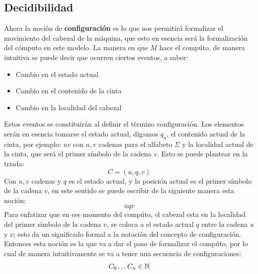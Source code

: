\documentclass[10pt]{report}
\begin{document}
     \subsection{Decidibilidad}\label{subsec:decidibilidad2}
    Ahora la noción de \textbf{configuración} es lo que nos permitirá formalizar el movimiento del
    cabezal de la máquina, que esto en esencia será la formalización del cómputo en este modelo.
    \newline
    La manera en que $M$ hace el compúto, de manera intuitiva se puede decir que ocurren ciertos eventos, a saber:
    \begin{itemize}
        \item Cambio en el estado actual
        \item Cambio en el contenido de la cinta
        \item Cambio en la localidad del cabezal
    \end{itemize}
    Estos eventos se constituirán al definir el término configuración.
    Los elementos serán en esencia tomarse el estado actual, digamos $q_{a}$, el contenido actual de la cinta, por ejemplo:
    $uv$ con $u,v$ cadenas para el alfabeto $\Sigma$ y la localidad actual de la cinta, que será el primer
    símbolo de la cadena $v$. \newline
    Esto se puede plantear en la triada:
    \begin{equation}
        C = (u,q,v)
    \end{equation}
    Con $u,v$ cadenas y $q$ es el estado actual, y la posición actual es el primer símbolo de la cadena $v$,
    en este sentido se puede escribir de la siguiente manera esta noción:
    \begin{equation}
        uqv
    \end{equation}
    Para enfatizar que en ese momento del compúto, el cabezal esta en la localidad del primer símbolo de la cadena
    $v$, se coloca a el estado actual $q$ entre la cadena $u$ y $v$; esto da un significado formal a la notación del concepto
    de configuración.
    \\
    \newline
    Entonces esta noción es la que va a dar el paso de formalizar el compúto, por lo cual de manera intuitivamente se va
    a tener una secuencia de configuraciones:\newline
    \begin{equation}
        C_{0}\mathellipsis C_{n}\in\mathbb{N}
    \end{equation}
    \newline
\end{document}
